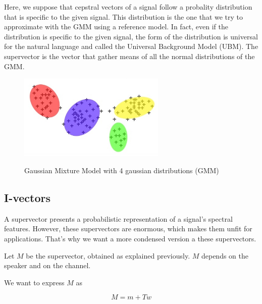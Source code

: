 \documentclass[conference]{IEEEtran}
\begin{document}
Here, we suppose that cepstral vectors of a signal follow a probality
distribution that is specific to the given signal. This distribution is the one
that we try to approximate with the GMM using a reference model. In fact, even 
if the distribution is specific to the given signal, the form of the 
distribution is universal for the natural language and called the Universal 
Background Model (UBM). The supervector is the vector that gather means of 
all the normal distributions of the GMM.  \\


\begin{figure}[!h]
    \centering
    \caption{Gaussian Mixture Model with 4 gaussian distributions (GMM)}
    \includegraphics[width=7cm]{GMM.jpg}
    \label{gmm}
\end{figure}

\subsection{I-vectors}


A supervector presents a probabilistic representation of a signal's spectral features. 
However, these supervectors are enormous, which makes them unfit for applications.
That's why we want a more condensed version a these supervectors.


Let $M$ be the supervector, obtained as explained previously. $M$ depends on the speaker and on the channel. 


We want to express $M$ as

\begin{equation}
M = m + Tw
\end{equation}
\end{document}
